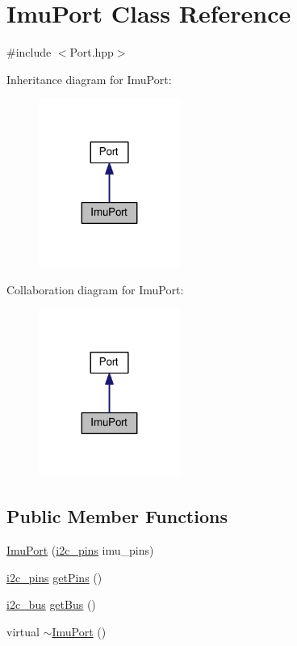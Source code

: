\hypertarget{classImuPort}{}\section{Imu\+Port Class Reference}
\label{classImuPort}


{\ttfamily \#include $<$Port.\+hpp$>$}



Inheritance diagram for Imu\+Port\+:\nopagebreak
\begin{figure}[H]
\begin{center}
\leavevmode
\includegraphics[width=131pt]{classImuPort__inherit__graph}
\end{center}
\end{figure}


Collaboration diagram for Imu\+Port\+:\nopagebreak
\begin{figure}[H]
\begin{center}
\leavevmode
\includegraphics[width=131pt]{classImuPort__coll__graph}
\end{center}
\end{figure}
\subsection*{Public Member Functions}
\begin{DoxyCompactItemize}
\item 
\hyperlink{classImuPort_a5fd86378f772f9eedf0d125229fc9bc0}{Imu\+Port} (\hyperlink{Arduino_8hpp_aaa5bce2cb83fc43fec67214bf4feea69}{i2c\+\_\+pins} imu\+\_\+pins)
\item 
\hyperlink{Arduino_8hpp_aaa5bce2cb83fc43fec67214bf4feea69}{i2c\+\_\+pins} \hyperlink{classImuPort_a16c0e671ec33d7533130b0c1af51a216}{get\+Pins} ()
\item 
\hyperlink{Arduino_8hpp_ab2e3db7382e551f5b0485447adcad03e}{i2c\+\_\+bus} \hyperlink{classImuPort_aecbe963045ee71d96a4fccfe27537e51}{get\+Bus} ()
\item 
virtual \hyperlink{classImuPort_acc89c78df2ebb97834f035a97435ac5a}{$\sim$\+Imu\+Port} ()
\end{DoxyCompactItemize}
